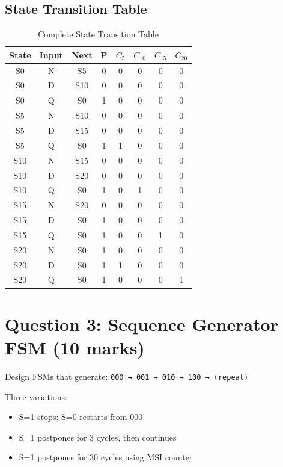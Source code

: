 \documentclass[12pt,a4paper]{article}
\begin{document}
\subsection{State Transition Table}

\begin{table}[H]
\centering
\footnotesize
\begin{tabular}{c|c|c|ccccc}
\toprule
\textbf{State} & \textbf{Input} & \textbf{Next} & P & $C_5$ & $C_{10}$ & $C_{15}$ & $C_{20}$ \\
\midrule
S0 & N & S5 & 0 & 0 & 0 & 0 & 0 \\
S0 & D & S10 & 0 & 0 & 0 & 0 & 0 \\
S0 & Q & S0 & 1 & 0 & 0 & 0 & 0 \\
\midrule
S5 & N & S10 & 0 & 0 & 0 & 0 & 0 \\
S5 & D & S15 & 0 & 0 & 0 & 0 & 0 \\
S5 & Q & S0 & 1 & 1 & 0 & 0 & 0 \\
\midrule
S10 & N & S15 & 0 & 0 & 0 & 0 & 0 \\
S10 & D & S20 & 0 & 0 & 0 & 0 & 0 \\
S10 & Q & S0 & 1 & 0 & 1 & 0 & 0 \\
\midrule
S15 & N & S20 & 0 & 0 & 0 & 0 & 0 \\
S15 & D & S0 & 1 & 0 & 0 & 0 & 0 \\
S15 & Q & S0 & 1 & 0 & 0 & 1 & 0 \\
\midrule
S20 & N & S0 & 1 & 0 & 0 & 0 & 0 \\
S20 & D & S0 & 1 & 1 & 0 & 0 & 0 \\
S20 & Q & S0 & 1 & 0 & 0 & 0 & 1 \\
\bottomrule
\end{tabular}
\caption{Complete State Transition Table}
\end{table}

\newpage
\section{Question 3: Sequence Generator FSM (10 marks)}

\begin{solutionbox}
Design FSMs that generate: \texttt{000 → 001 → 010 → 100 → (repeat)}

Three variations:
\begin{itemize}
  \item[(a)] S=1 stops; S=0 restarts from 000
  \item[(b)] S=1 postpones for 3 cycles, then continues
  \item[(c)] S=1 postpones for 30 cycles using MSI counter
\end{itemize}
\end{solutionbox}
\end{document}
